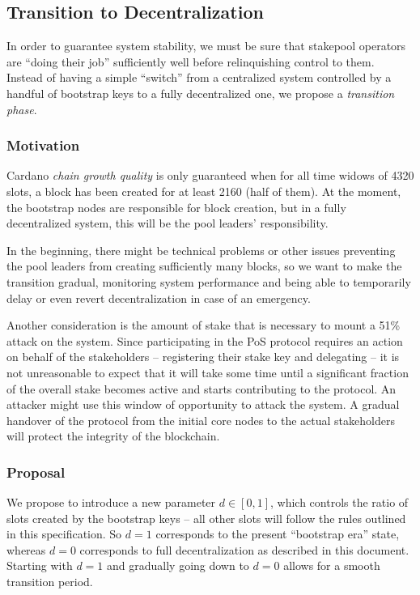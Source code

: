 \documentclass[11pt,a4paper]{article}
\begin{document}
\subsection{Transition to Decentralization}
\label{transition-to-decentralization}

In order to guarantee system stability, we must be sure that stakepool
operators are ``doing their job'' sufficiently well before relinquishing
control to them. Instead of having a simple ``switch'' from a
centralized system controlled by a handful of bootstrap keys to a fully
decentralized one, we propose a \emph{transition phase}.

\subsubsection{Motivation}
\label{motivation}

Cardano \emph{chain growth quality} is only guaranteed when for all time
widows of 4320 slots, a block has been created for at least 2160 (half
of them). At the moment, the bootstrap nodes are responsible for block
creation, but in a fully decentralized system, this will be the pool
leaders' responsibility.

In the beginning, there might be technical problems or other issues
preventing the pool leaders from creating sufficiently many blocks, so
we want to make the transition gradual, monitoring system performance
and being able to temporarily delay or even revert decentralization in
case of an emergency.

Another consideration is the amount of stake that is necessary to mount
a 51\% attack on the system. Since participating in the PoS protocol
requires an action on behalf of the stakeholders -- registering their
stake key and delegating -- it is not unreasonable to expect that it
will take some time until a significant fraction of the overall stake
becomes active and starts contributing to the protocol. An attacker
might use this window of opportunity to attack the system. A gradual
handover of the protocol from the initial core nodes to the actual
stakeholders will protect the integrity of the blockchain.

\subsubsection{Proposal}
\label{proposal}

We propose to introduce a new parameter \(d\in[0,1]\), which controls
the ratio of slots created by the bootstrap keys -- all other slots will
follow the rules outlined in this specification. So \(d=1\) corresponds
to the present ``bootstrap era'' state, whereas \(d=0\) corresponds to
full decentralization as described in this document. Starting with
\(d=1\) and gradually going down to \(d=0\) allows for a smooth
transition period.
\end{document}
